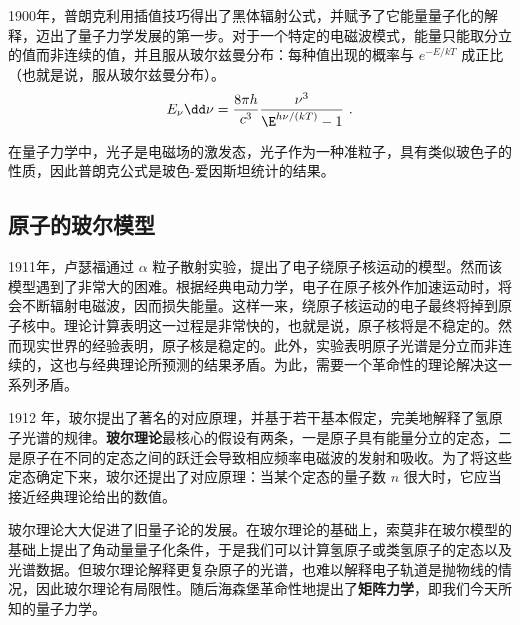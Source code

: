 1900年，普朗克利用插值技巧得出了黑体辐射公式，并赋予了它能量量子化的解释，迈出了量子力学发展的第一步。对于一个特定的电磁波模式，能量只能取分立的值而非连续的值，并且服从玻尔兹曼分布：每种值出现的概率与 $e^{-E/kT}$ 成正比（也就是说，服从玻尔兹曼分布）。
\begin{equation}
E_\nu \dd \nu=\frac{8\pi h}{c^3}\frac{\nu^3}{\E^{h\nu/(k T)} - 1}~.
\end{equation}

在量子力学中，光子是电磁场的激发态，光子作为一种准粒子，具有类似玻色子的性质，因此普朗克公式是玻色-爱因斯坦统计的结果。

\subsection{原子的玻尔模型}
1911年，卢瑟福通过 $\alpha$ 粒子散射实验，提出了电子绕原子核运动的模型。然而该模型遇到了非常大的困难。根据经典电动力学，电子在原子核外作加速运动时，将会不断辐射电磁波，因而损失能量。这样一来，绕原子核运动的电子最终将掉到原子核中。理论计算表明这一过程是非常快的，也就是说，原子核将是不稳定的。然而现实世界的经验表明，原子核是稳定的。此外，实验表明原子光谱是分立而非连续的，这也与经典理论所预测的结果矛盾。为此，需要一个革命性的理论解决这一系列矛盾。

1912 年，玻尔提出了著名的对应原理，并基于若干基本假定，完美地解释了氢原子光谱的规律。\textbf{玻尔理论}最核心的假设有两条，一是原子具有能量分立的定态，二是原子在不同的定态之间的跃迁会导致相应频率电磁波的发射和吸收。为了将这些定态确定下来，玻尔还提出了对应原理：当某个定态的量子数 $n$ 很大时，它应当接近经典理论给出的数值。

玻尔理论大大促进了旧量子论的发展。在玻尔理论的基础上，索莫非在玻尔模型的基础上提出了角动量量子化条件，于是我们可以计算氢原子或类氢原子的定态以及光谱数据。但玻尔理论解释更复杂原子的光谱，也难以解释电子轨道是抛物线的情况，因此玻尔理论有局限性。随后海森堡革命性地提出了\textbf{矩阵力学}，即我们今天所知的量子力学。
